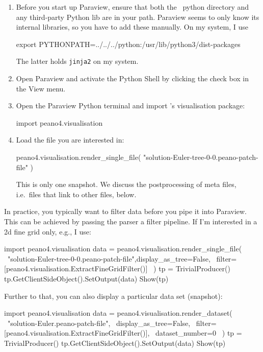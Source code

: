 \begin{enumerate}
  \item Before you start up Paraview, ensure that both the \Peano\ python
  directory and any third-party Python lib are in your path. Paraview seems to
  only know its internal libraries, so you have to add these manually. On my
  system, I use
  \begin{code}
export PYTHONPATH=../../../python:/usr/lib/python3/dist-packages  
  \end{code}
  The latter holds \texttt{jinja2} on my system.
  \item Open Paraview and activate the Python Shell by clicking the check box in
  the View menu.
  \item Open the Paraview Python terminal and import \Peano's visualisation
  package:
  \begin{code}
import peano4.visualisation  
  \end{code}
  \item Load the file you are interested in:
  \begin{code}
peano4.visualisation.render_single_file( "solution-Euler-tree-0-0.peano-patch-file" ) 
  \end{code}
  This is only one snapshot. We discuss the postprocessing of meta files,
  i.e.~files that link to other files, below.
\end{enumerate}


\noindent
In practice, you typically want to filter data before you pipe it into Paraview.
This can be achieved by passing the parser a filter pipeline. If I'm interested
in a 2d fine grid only, e.g., I use:

\begin{code}
import peano4.visualisation  
data = peano4.visualisation.render_single_file( \
  "solution-Euler-tree-0-0.peano-patch-file",display_as_tree=False, \
  filter=[peano4.visualisation.ExtractFineGridFilter()] \
)
tp = TrivialProducer()
tp.GetClientSideObject().SetOutput(data)
Show(tp)
\end{code}


\noindent
Further to that, you can also display a particular data set (snapshot):
\begin{code}
import peano4.visualisation  
data = peano4.visualisation.render_dataset( \
  "solution-Euler.peano-patch-file", \
  display_as_tree=False, \
  filter=[peano4.visualisation.ExtractFineGridFilter()], \
  dataset_number=0 \
)
tp = TrivialProducer()
tp.GetClientSideObject().SetOutput(data)
Show(tp)
\end{code}




